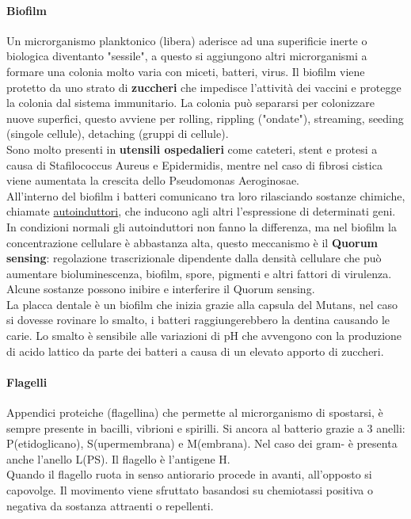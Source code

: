 \documentclass[10pt]{article}
\begin{document}
\paragraph*{Biofilm} Un microrganismo planktonico (libera) aderisce ad una superificie inerte o biologica diventanto "sessile", a questo si aggiungono altri microrganismi a formare una colonia molto varia con miceti, batteri, virus. Il biofilm viene protetto da uno strato di \textbf{zuccheri} che impedisce l'attività dei vaccini e protegge la colonia dal sistema immunitario. La colonia può separarsi per colonizzare nuove superfici, questo avviene per rolling, rippling ("ondate"), streaming, seeding (singole cellule), detaching (gruppi di cellule). \\
Sono molto presenti in \textbf{utensili ospedalieri} come cateteri, stent e protesi a causa di Stafilococcus Aureus e Epidermidis, mentre nel caso di fibrosi cistica viene aumentata la crescita dello Pseudomonas Aeroginosae.\\
All'interno del biofilm i batteri comunicano tra loro rilasciando sostanze chimiche, chiamate \underline{autoinduttori}, che inducono agli altri l'espressione di determinati geni. In condizioni normali gli autoinduttori non fanno la differenza, ma nel biofilm la concentrazione cellulare è abbastanza alta, questo meccanismo è il \textbf{Quorum sensing}: regolazione trascrizionale dipendente dalla densità cellulare che può aumentare bioluminescenza, biofilm, spore, pigmenti e altri fattori di virulenza. Alcune sostanze possono inibire e interferire il Quorum sensing.\\
La placca dentale è un biofilm che inizia grazie alla capsula del Mutans, nel caso si dovesse rovinare lo smalto, i batteri raggiungerebbero la dentina causando le carie. Lo smalto è sensibile alle variazioni di pH che avvengono con la produzione di acido lattico da parte dei batteri a causa di un elevato apporto di zuccheri.
\paragraph*{Flagelli} Appendici proteiche (flagellina) che permette al microrganismo di spostarsi, è sempre presente in bacilli, vibrioni e spirilli. Si ancora al batterio grazie a 3 anelli: P(etidoglicano), S(upermembrana) e M(embrana). Nel caso dei gram- è presenta anche l'anello L(PS). Il flagello è l'antigene H.\\
Quando il flagello ruota in senso antiorario procede in avanti, all'opposto si capovolge. Il movimento viene sfruttato basandosi su chemiotassi positiva o negativa da sostanza attraenti o repellenti. 
\end{document}

